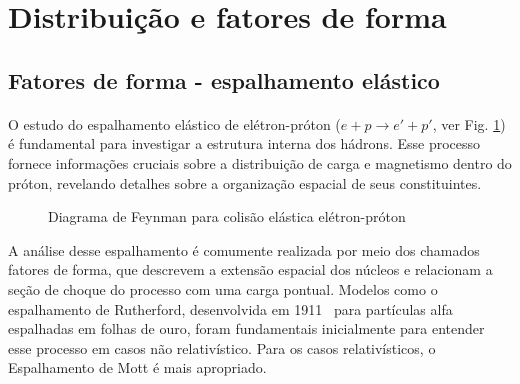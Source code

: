 \section{Distribuição e fatores de forma}
\subsection{Fatores de forma - espalhamento elástico}
\paragraph{}
O estudo do espalhamento elástico de elétron-próton ($e + p \rightarrow e' + p'$, ver  Fig. \ref{fig:elast-ep}) é fundamental para investigar a estrutura interna dos hádrons. Esse processo fornece informações cruciais sobre a distribuição de carga e magnetismo dentro do próton, revelando detalhes sobre a organização espacial de seus constituintes.
\begin{figure}[h!]
    \centering
    \caption{Diagrama de Feynman para colisão elástica elétron-próton}
    \label{fig:elast-ep}
\end{figure}

A análise desse espalhamento é comumente realizada por meio dos chamados fatores de forma, que descrevem a extensão espacial dos núcleos e relacionam a seção de choque do processo com uma carga pontual. Modelos como  o espalhamento de Rutherford, desenvolvida em 1911~\cite{rutherford} para partículas alfa espalhadas em folhas de ouro, foram fundamentais inicialmente para entender esse processo em casos não relativístico. Para os casos relativísticos, o Espalhamento de Mott  é mais apropriado.

